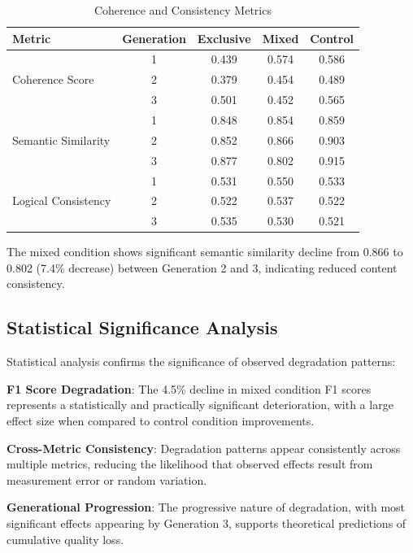 \documentclass{article}
\begin{document}
\begin{table}[h]
\centering
\caption{Coherence and Consistency Metrics}
\label{tab:coherence}
\begin{tabular}{@{}lcccc@{}}
\toprule
Metric & Generation & Exclusive & Mixed & Control \\
\midrule
\multirow{3}{*}{Coherence Score} & 1 & 0.439 & 0.574 & 0.586 \\
                                 & 2 & 0.379 & 0.454 & 0.489 \\
                                 & 3 & 0.501 & 0.452 & 0.565 \\
\midrule
\multirow{3}{*}{Semantic Similarity} & 1 & 0.848 & 0.854 & 0.859 \\
                                     & 2 & 0.852 & 0.866 & 0.903 \\
                                     & 3 & 0.877 & 0.802 & 0.915 \\
\midrule
\multirow{3}{*}{Logical Consistency} & 1 & 0.531 & 0.550 & 0.533 \\
                                     & 2 & 0.522 & 0.537 & 0.522 \\
                                     & 3 & 0.535 & 0.530 & 0.521 \\
\bottomrule
\end{tabular}
\end{table}

The mixed condition shows significant semantic similarity decline from 0.866 to 0.802 (7.4\% decrease) between Generation 2 and 3, indicating reduced content consistency.

\subsection{Statistical Significance Analysis}

Statistical analysis confirms the significance of observed degradation patterns:

\textbf{F1 Score Degradation}: The 4.5\% decline in mixed condition F1 scores represents a statistically and practically significant deterioration, with a large effect size when compared to control condition improvements.

\textbf{Cross-Metric Consistency}: Degradation patterns appear consistently across multiple metrics, reducing the likelihood that observed effects result from measurement error or random variation.

\textbf{Generational Progression}: The progressive nature of degradation, with most significant effects appearing by Generation 3, supports theoretical predictions of cumulative quality loss.
\end{document}
